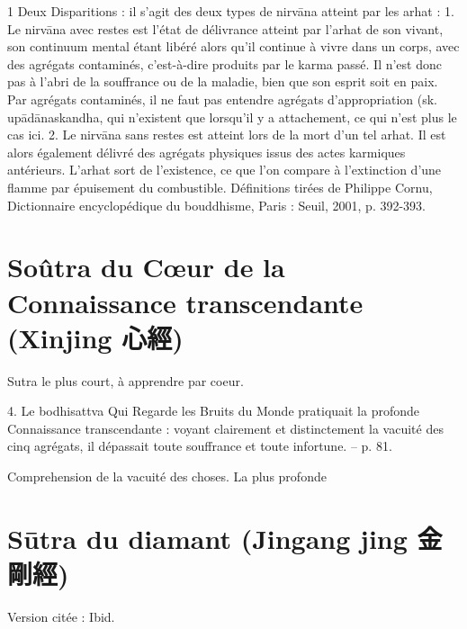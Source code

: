  1 Deux Disparitions : il s’agit des deux types de nirvāna atteint par les arhat : 1. Le nirvāna avec restes est l’état de délivrance atteint par l’arhat de son vivant, son continuum mental étant libéré alors qu’il continue à vivre dans un corps, avec des agrégats contaminés, c’est-à-dire produits par le karma passé. Il n’est donc pas à l’abri de la souffrance ou de la maladie, bien que son esprit soit en paix. Par agrégats contaminés, il ne faut pas entendre agrégats d’appropriation (sk. upādānaskandha, qui n’existent que lorsqu’il y a attachement, ce qui n’est plus le cas ici. 2. Le nirvāna sans restes est atteint lors de la mort d’un tel arhat. Il est alors également délivré des agrégats physiques issus des actes karmiques antérieurs. L’arhat sort de l’existence, ce que l’on compare à l’extinction d’une flamme par épuisement du combustible. Définitions tirées de Philippe Cornu, Dictionnaire encyclopédique du bouddhisme, Paris : Seuil, 2001, p. 392-393.


\section{Soûtra du Cœur de la Connaissance transcendante
(Xinjing 心經)}
Sutra le plus court, à apprendre par coeur. 


\begin{singlequote}
    4.	Le bodhisattva Qui Regarde les Bruits du Monde pratiquait la profonde Connaissance transcendante : voyant clairement et distinctement la vacuité des cinq agrégats, il dépassait toute souffrance et toute infortune.
-- p. 81.
\end{singlequote}

Comprehension de la vacuité des choses. La plus profonde

\section{Sūtra du diamant (Jingang jing 金剛經)}


Version citée : Ibid.

